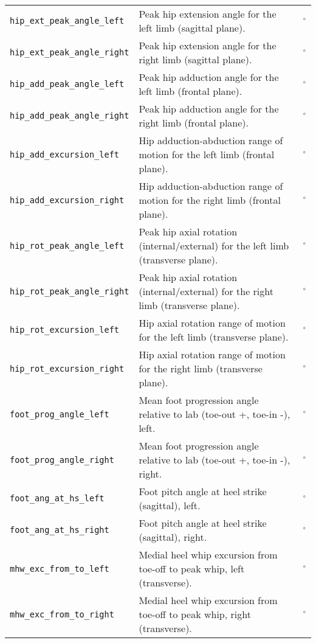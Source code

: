 {\begin{longtable}{@{}p{} p{} p{}@{}}
    \texttt{hip\_ext\_peak\_angle\_left} & Peak hip extension angle for the left limb (sagittal plane). & $^\circ$ \\
    \texttt{hip\_ext\_peak\_angle\_right} & Peak hip extension angle for the right limb (sagittal plane). & $^\circ$ \\
    \texttt{hip\_add\_peak\_angle\_left} & Peak hip adduction angle for the left limb (frontal plane). & $^\circ$ \\
    \texttt{hip\_add\_peak\_angle\_right} & Peak hip adduction angle for the right limb (frontal plane). & $^\circ$ \\
    \texttt{hip\_add\_excursion\_left} & Hip adduction-abduction range of motion for the left limb (frontal plane). & $^\circ$ \\
    \texttt{hip\_add\_excursion\_right} & Hip adduction-abduction range of motion for the right limb (frontal plane). & $^\circ$ \\
    \texttt{hip\_rot\_peak\_angle\_left} & Peak hip axial rotation (internal/external) for the left limb (transverse plane). & $^\circ$ \\
    \texttt{hip\_rot\_peak\_angle\_right} & Peak hip axial rotation (internal/external) for the right limb (transverse plane). & $^\circ$ \\
    \texttt{hip\_rot\_excursion\_left} & Hip axial rotation range of motion for the left limb (transverse plane). & $^\circ$ \\
    \texttt{hip\_rot\_excursion\_right} & Hip axial rotation range of motion for the right limb (transverse plane). & $^\circ$ \\
    \texttt{foot\_prog\_angle\_left} & Mean foot progression angle relative to lab (toe-out +, toe-in -), left. & $^\circ$ \\
    \texttt{foot\_prog\_angle\_right} & Mean foot progression angle relative to lab (toe-out +, toe-in -), right. & $^\circ$ \\
    \texttt{foot\_ang\_at\_hs\_left} & Foot pitch angle at heel strike (sagittal), left. & $^\circ$ \\
    \texttt{foot\_ang\_at\_hs\_right} & Foot pitch angle at heel strike (sagittal), right. & $^\circ$ \\
    \texttt{mhw\_exc\_from\_to\_left} & Medial heel whip excursion from toe-off to peak whip, left (transverse). & $^\circ$ \\
    \texttt{mhw\_exc\_from\_to\_right} & Medial heel whip excursion from toe-off to peak whip, right (transverse). & $^\circ$ \\

\end{longtable}}
